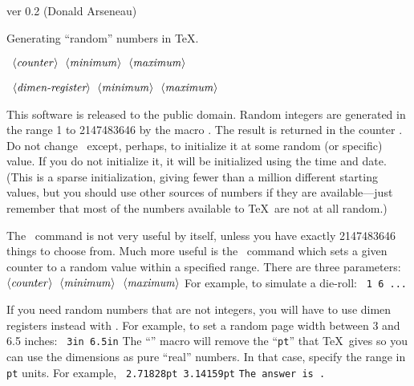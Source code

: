 
\def\cmd#1{\leavevmode\hbox{\tt\string#1}}
\edef\{{\string{}
\edef\}{\string}}

\qquad\qquad  ver 0.2 \qquad\qquad  (Donald Arseneau)

\bigskip

\noindent Generating ``random'' numbers in \TeX. 

\medskip

  {\tt \string\setrannum \thinspace\{$\langle \it counter\rangle$\}\thinspace\{$\langle\it minimum\rangle$\}\thinspace\{$\langle\it maximum\rangle$\}}

  {\tt \string\setrandimen \thinspace\{$\langle \hbox{\it dimen-register}\rangle$\}\thinspace\{$\langle\it minimum\rangle$\}\thinspace\{$\langle\it maximum\rangle$\}}

\medskip
\noindent This software is released to the public domain.
\bigskip
\noindent Random integers are generated in the range 1 to 2147483646 by the
macro \cmd\nextrandom.  The result is returned in the counter \cmd\randomi.
Do not change \cmd\randomi\ except, perhaps, to initialize it at some
random (or specific) value.  If you do not initialize it, it will be initialized
using the time and date.  (This is a sparse initialization, giving
fewer than a million different starting values, but you should use
other sources of numbers if they are available---just remember that
most of the numbers available to \TeX\ are not at all random.)

The \cmd\nextrandom\ command is not very useful by itself, unless you
have exactly 2147483646 things to choose from.  Much more useful
is the \cmd\setrannum\ command which sets a given counter to a random
value within a specified range.  There are three parameters:
\medskip
{\tt \string\setrannum \thinspace\{$\langle \it counter\rangle$\}\thinspace\{$\langle\it minimum\rangle$\}\thinspace\{$\langle\it maximum\rangle$\}}
\medskip
\noindent For example, to simulate a die-roll:
\medskip
{\tt \string\setrannum\{\string\die\}\{1\}\{6\} \string\ifcase\string\die...}
\medskip

If you need random numbers that are not integers, you will have to
use dimen registers instead with \cmd\setrandimen.  For example, to set a random
page width between 3 and 6.5 inches:
\medskip
\cmd\setrandimen \cmd\hsize{\tt\{3in\}\{6.5in\}}
\medskip\noindent
The ``\cmd\pointless'' macro
will remove the ``{\tt pt}'' that \TeX\ gives so you can use the dimensions
as pure ``real'' numbers.  In that case, specify the range in {\tt pt} units.
For example,
\medskip
   {\tt\string\setrandimen\string\answer\{2.71828pt\}\{3.14159pt\}}
   \hfill\break\indent
   {\tt The answer is \string\pointless\string\answer.}
\medskip

